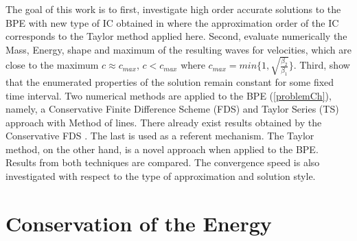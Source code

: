 \documentclass[%
 aip,
cp,  %
 amsmath,amssymb,%
 reprint,%
]{revtex4-2}
\newcommand{\rf}[1]{(\ref{#1})}
\begin{document}
The goal of this work is to first, investigate high order accurate solutions to the BPE with new type of IC obtained in \cite{ref16} where the approximation order of the IC corresponds to the Taylor method applied here. Second, evaluate numerically the Mass, Energy, shape and maximum of the resulting waves for velocities, which are close to the maximum $c \approx c_{max}$, $c < c_{max}$ where $c_{max} = min\{1, \sqrt{ \frac{\beta_2}{\beta_1} } \}$. Third, show that the enumerated properties of the solution remain constant for some fixed time interval. Two numerical methods are applied to the BPE \rf{problemCh}, namely, a Conservative Finite Difference Scheme (FDS) and Taylor Series (TS) approach with Method of lines. There already exist results obtained by the Conservative FDS \cite{ref20}. The last is used as a referent mechanism. The Taylor method, on the other hand, is a novel approach when applied to the BPE. Results from both techniques are compared. The convergence speed is also investigated with respect to the type of approximation and solution style.

\section{Conservation of the Energy}
\end{document}
